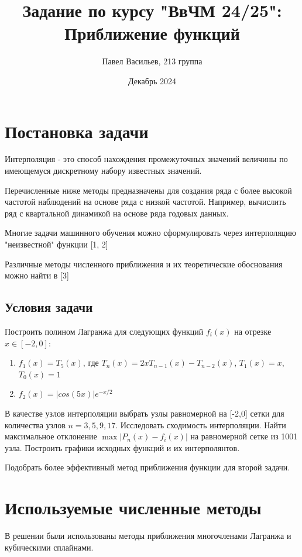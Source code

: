 \documentclass{article}
\title{Задание по курсу "ВвЧМ 24/25": Приближение функций}
\author{Павел Васильев, 213 группа}
\date{Декабрь 2024}
\begin{document}
\maketitle

\section{Постановка задачи}
Интерполяция - это способ нахождения промежуточных значений величины по имеющемуся дискретному набору известных значений.

Перечисленные ниже методы предназначены для создания ряда с более высокой частотой наблюдений на основе ряда с низкой частотой. Например, вычислить ряд с квартальной динамикой на основе ряда годовых данных.

Многие задачи машинного обучения можно сформулировать через интерполяцию "неизвестной" функции [1, 2]

Различные методы численного приближения и их теоретические обоснования можно найти в [3]

\subsection{Условия задачи}
Построить полином Лагранжа для следующих функций \(f_i(x)\) на отрезке \(x \in [-2,0]\):
\begin{enumerate}
    \item \(f_1(x) = T_5(x)\), где \(T_n(x) = 2xT_{n-1}(x) - T_{n-2}(x)\), \(T_1(x) = x\), \(T_0(x) = 1\)
    \item \(f_2(x)=|cos(5x)|e^{-x/2}\)
\end{enumerate}
В качестве узлов интерполяции выбрать узлы равномерной на [-2,0] сетки для количества узлов \(n=3,5,9,17\). Исследовать сходимость интерполяции. Найти максимальное отклонение \(\max|P_n(x)-f_i(x)|\) на равномерной сетке из 1001 узла. Построить графики исходных функций и их интерполянтов.

Подобрать более эффективный метод приближения функции для второй задачи.


\section{Используемые численные методы}
В решении были использованы методы приближения многочленами Лагранжа и кубическими сплайнами.
\end{document}
